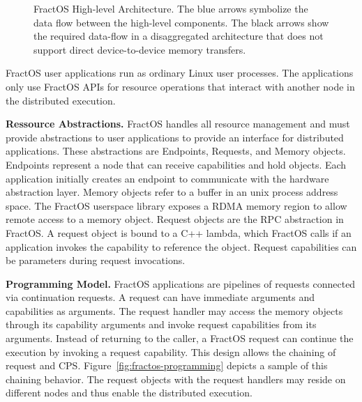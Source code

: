 \begin{figure}[ht]
  \centering
  
  \caption{\label{fig:fratos-high-level} FractOS High-level Architecture. The blue arrows symbolize the data flow between the high-level components. The black arrows show the required data-flow in a disaggregated architecture that does not support direct device-to-device memory transfers.}
\end{figure}

FractOS user applications run as ordinary Linux user processes. The applications only use FractOS \acp{API} for resource operations that interact with another node in the distributed execution.

\textbf{Ressource Abstractions.}
FractOS handles all resource management and must provide abstractions to user applications to provide an interface for distributed applications. These abstractions are Endpoints, Requests, and Memory objects. Endpoints represent a node that can receive capabilities and hold objects. Each application initially creates an endpoint to communicate with the hardware abstraction layer. Memory objects refer to a buffer in an unix process address space. The FractOS userspace library exposes a \ac{RDMA} memory region to allow remote access to a memory object. Request objects are the \ac{RPC} abstraction in FractOS\@. A request object is bound to a C++ lambda, which FractOS calls if an application invokes the capability to reference the object. Request capabilities can be parameters during request invocations.

\textbf{Programming Model.}
FractOS applications are pipelines of requests connected via continuation requests. A request can have immediate arguments and capabilities as arguments. The request handler may access the memory objects through its capability arguments and invoke request capabilities from its arguments. Instead of returning to the caller, a FractOS request can continue the execution by invoking a request capability. This design allows the chaining of request and \ac{CPS}. Figure~\ref{fig:fractos-programming} depicts a sample of this chaining behavior. The request objects with the request handlers may reside on different nodes and thus enable the distributed execution.

